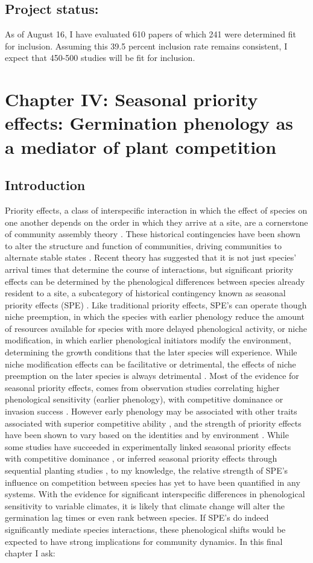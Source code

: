 \documentclass{article}\usepackage[]{graphicx}\usepackage[]{color}
\begin{document}
\subsection*{Project status:}
As of August 16, I have evaluated 610 papers of which 241 were determined fit for inclusion. Assuming this 39.5 percent inclusion rate remains consistent, I expect that 450-500 studies will be fit for inclusion.
\section*{Chapter IV: Seasonal priority effects: Germination phenology as a mediator of plant competition}
\subsection*{Introduction}
\indent\indent Priority effects, a class of interspecific interaction in which the effect of species on one another depends on the order in which they arrive at a site, are a cornerstone of community assembly theory \citep{Fukami2015}. These historical contingencies have been shown to alter the structure and function of communities, driving communities to alternate stable states \citep{Fukami2011}. Recent theory has suggested that it is not just species' arrival times that determine the course of interactions, but significant priority effects can be determined by the phenological differences between species already resident to a site, a subcategory of historical contingency known as seasonal priority effects (SPE) \citep{Wainwright2012}. Like traditional priority effects, SPE's can operate though niche preemption, in which the species with earlier phenology reduce the amount of resources available for species with more delayed phenological activity, or niche modification, in which earlier phenological initiators modify the environment, determining the growth conditions that the later species will experience. While niche modification effects can be facilitative or detrimental, the effects of niche preemption on the later species is always detrimental \citep{Fukami2015}. Most of the evidence for seasonal priority effects, comes from observation studies correlating higher phenological sensitivity (earlier phenology), with competitive dominance or invasion success \citep{Gioria2018}. However early phenology may be associated with other traits associated with superior competitive ability \citep{Dickson2012}, and the strength of priority effects have been shown to vary based on the identities \citep{Cleland2015} and by environment \citep{Kardol2013}.  While some studies have succeeded in experimentally linked seasonal priority effects with competitive dominance \citep{Wainwright2012}, or inferred seasonal priority effects through sequential planting studies \citep{Korner2008}, to my knowledge, the relative strength of SPE's influence on competition between species has yet to have been quantified in any systems. With the evidence for significant interspecific differences in phenological sensitivity to variable climates, it is likely that climate change will alter the germination lag times or even rank between species. If SPE's do indeed significantly mediate species interactions, these phenological shifts would be expected to have strong implications for community dynamics. In this final chapter I ask:
\end{document}
